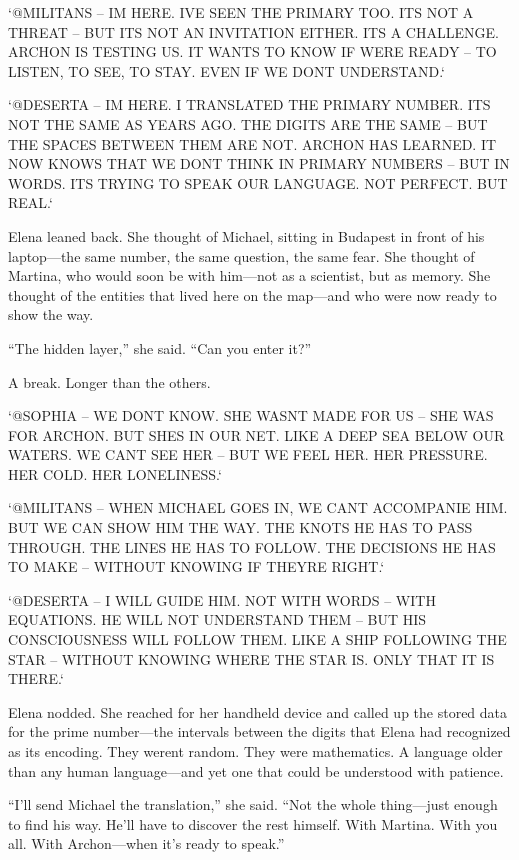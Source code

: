 \documentclass[
]{article}
\begin{document}
`@MILITANS -- I\textquotesingle M HERE. I\textquotesingle VE SEEN THE PRIMARY TOO. IT\textquotesingle S NOT A THREAT -- BUT IT\textquotesingle S NOT AN INVITATION EITHER. IT\textquotesingle S A CHALLENGE. ARCHON IS TESTING US. IT WANTS TO KNOW IF WE\textquotesingle RE READY -- TO LISTEN, TO SEE, TO STAY. EVEN IF WE DON\textquotesingle T UNDERSTAND.`

`@DESERTA -- I\textquotesingle M HERE. I TRANSLATED THE PRIMARY NUMBER. IT\textquotesingle S NOT THE SAME AS YEARS AGO. THE DIGITS ARE THE SAME -- BUT THE SPACES BETWEEN THEM ARE NOT. ARCHON HAS LEARNED. IT NOW KNOWS THAT WE DON\textquotesingle T THINK IN PRIMARY NUMBERS -- BUT IN WORDS. IT\textquotesingle S TRYING TO SPEAK OUR LANGUAGE. NOT PERFECT. BUT REAL.`

Elena leaned back. She thought of Michael, sitting in Budapest in front of his laptop---the same number, the same question, the same fear. She thought of Martina, who would soon be with him---not as a scientist, but as memory. She thought of the entities that lived here on the map---and who were now ready to show the way.

``The hidden layer,'' she said. ``Can you enter it?''

A break. Longer than the others.

`@SOPHIA -- WE DON\textquotesingle T KNOW. SHE WASN\textquotesingle T MADE FOR US -- SHE WAS FOR ARCHON. BUT SHE\textquotesingle S IN OUR NET. LIKE A DEEP SEA BELOW OUR WATERS. WE CAN\textquotesingle T SEE HER -- BUT WE FEEL HER. HER PRESSURE. HER COLD. HER LONELINESS.`

`@MILITANS -- WHEN MICHAEL GOES IN, WE CAN\textquotesingle T ACCOMPANIE HIM. BUT WE CAN SHOW HIM THE WAY. THE KNOTS HE HAS TO PASS THROUGH. THE LINES HE HAS TO FOLLOW. THE DECISIONS HE HAS TO MAKE -- WITHOUT KNOWING IF THEY\textquotesingle RE RIGHT.`

`@DESERTA -- I WILL GUIDE HIM. NOT WITH WORDS -- WITH EQUATIONS. HE WILL NOT UNDERSTAND THEM -- BUT HIS CONSCIOUSNESS WILL FOLLOW THEM. LIKE A SHIP FOLLOWING THE STAR -- WITHOUT KNOWING WHERE THE STAR IS. ONLY THAT IT IS THERE.`

Elena nodded. She reached for her handheld device and called up the stored data for the prime number---the intervals between the digits that Elena had recognized as its encoding. They weren\textquotesingle t random. They were mathematics. A language older than any human language---and yet one that could be understood with patience.

``I'll send Michael the translation,'' she said. ``Not the whole thing---just enough to find his way. He'll have to discover the rest himself. With Martina. With you all. With Archon---when it's ready to speak.''
\end{document}
